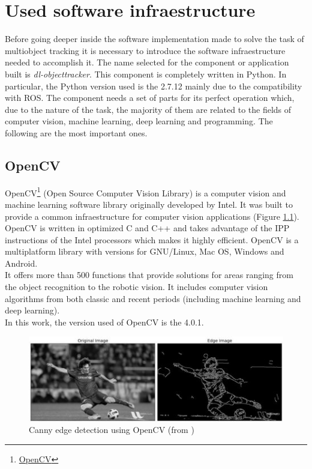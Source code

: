 \chapter{Used software infraestructure}

Before going deeper inside the software implementation made to solve the task of multiobject tracking it is necessary to introduce the software infraestructure needed to accomplish it. The name selected for the component or application built is \textit{dl-objecttracker}. This component is completely written in Python. In particular, the Python version used is the 2.7.12 mainly due to the compatibility with ROS. The component needs a set of parts for its perfect operation which, due to the nature of the task, the majority of them are related to the fields of computer vision, machine learning, deep learning and programming. The following are the most important ones.

\section{OpenCV}
OpenCV\footnote {\href{https://opencv.org/}{OpenCV}} (Open Source Computer Vision Library) is a computer vision and machine learning software library originally developed by Intel. It was built to provide a common infraestructure for computer vision applications (Figure \ref{fig:messi_canny}). OpenCV is written in optimized C and C++ and takes advantage of the IPP instructions of the Intel processors which makes it highly efficient. OpenCV is a multiplatform library with versions for GNU/Linux, Mac OS, Windows and Android.\\ It offers more than 500 functions that provide solutions for areas ranging from the object recognition to the robotic vision. It includes computer vision algorithms from both classic and recent periods (including machine learning and deep learning).\\
In this work, the version used of OpenCV is the 4.0.1.
\begin{figure}[H]
\begin{center}
\includegraphics[scale=0.7]{figures/canny.jpg}
\caption{Canny edge detection using OpenCV (from \cite{messy_canny})}
\label{fig:messi_canny}
\end{center}
\end{figure}
